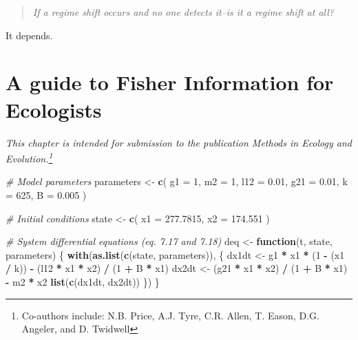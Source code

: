 \documentclass[12pt,twoside,openany]{reedthesis}
\newenvironment{Shaded}{\begin{snugshade}}{\end{snugshade}}
\newcommand{\KeywordTok}[1]{\textcolor[rgb]{0.13,0.29,0.53}{\textbf{#1}}}
\newcommand{\DataTypeTok}[1]{\textcolor[rgb]{0.13,0.29,0.53}{#1}}
\newcommand{\DecValTok}[1]{\textcolor[rgb]{0.00,0.00,0.81}{#1}}
\newcommand{\FloatTok}[1]{\textcolor[rgb]{0.00,0.00,0.81}{#1}}
\newcommand{\StringTok}[1]{\textcolor[rgb]{0.31,0.60,0.02}{#1}}
\newcommand{\CommentTok}[1]{\textcolor[rgb]{0.56,0.35,0.01}{\textit{#1}}}
\newcommand{\ControlFlowTok}[1]{\textcolor[rgb]{0.13,0.29,0.53}{\textbf{#1}}}
\newcommand{\OperatorTok}[1]{\textcolor[rgb]{0.81,0.36,0.00}{\textbf{#1}}}
\newcommand{\NormalTok}[1]{#1}
\begin{document}
\begin{quote}
\emph{If a regime shift occurs and no one detects it--is it a regime
shift at all?}
\end{quote}
It depends.

\chapter{A guide to Fisher Information for
Ecologists}\label{fiGuide-chapter}

\emph{This chapter is intended for submission to the publication
\emph{Methods in Ecology and Evolution}.\footnote{Co-authors include:
  N.B. Price, A.J. Tyre, C.R. Allen, T. Eason, D.G. Angeler, and D.
  Twidwell}}
\begin{Shaded}
\begin{Highlighting}[]
\CommentTok{# Model parameters}
\NormalTok{parameters <-}\StringTok{ }\KeywordTok{c}\NormalTok{(}
  \DataTypeTok{g1 =} \DecValTok{1}\NormalTok{,}
  \DataTypeTok{m2 =} \DecValTok{1}\NormalTok{,}
  \DataTypeTok{l12 =} \FloatTok{0.01}\NormalTok{,}
  \DataTypeTok{g21 =} \FloatTok{0.01}\NormalTok{,}
  \DataTypeTok{k =} \DecValTok{625}\NormalTok{,}
  \DataTypeTok{B =} \FloatTok{0.005}
\NormalTok{)}

\CommentTok{# Initial conditions}
\NormalTok{state <-}\StringTok{ }\KeywordTok{c}\NormalTok{(}
  \DataTypeTok{x1 =} \FloatTok{277.7815}\NormalTok{, }
  \DataTypeTok{x2 =} \FloatTok{174.551}
\NormalTok{)}

\CommentTok{# System differential equations (eq. 7.17 and 7.18)}
\NormalTok{deq <-}\StringTok{ }\ControlFlowTok{function}\NormalTok{(t, state, parameters) \{}
  \KeywordTok{with}\NormalTok{(}\KeywordTok{as.list}\NormalTok{(}\KeywordTok{c}\NormalTok{(state, parameters)), \{}
\NormalTok{    dx1dt <-}\StringTok{ }\NormalTok{g1 }\OperatorTok{*}\StringTok{ }\NormalTok{x1 }\OperatorTok{*}\StringTok{ }\NormalTok{(}\DecValTok{1} \OperatorTok{-}\StringTok{ }\NormalTok{(x1 }\OperatorTok{/}\StringTok{ }\NormalTok{k)) }\OperatorTok{-}\StringTok{ }\NormalTok{(l12 }\OperatorTok{*}\StringTok{ }\NormalTok{x1 }\OperatorTok{*}\StringTok{ }\NormalTok{x2) }\OperatorTok{/}\StringTok{ }\NormalTok{(}\DecValTok{1} \OperatorTok{+}\StringTok{ }\NormalTok{B }\OperatorTok{*}\StringTok{ }\NormalTok{x1)}
\NormalTok{    dx2dt <-}\StringTok{ }\NormalTok{(g21 }\OperatorTok{*}\StringTok{ }\NormalTok{x1 }\OperatorTok{*}\StringTok{ }\NormalTok{x2) }\OperatorTok{/}\StringTok{ }\NormalTok{(}\DecValTok{1} \OperatorTok{+}\StringTok{ }\NormalTok{B }\OperatorTok{*}\StringTok{ }\NormalTok{x1) }\OperatorTok{-}\StringTok{ }\NormalTok{m2 }\OperatorTok{*}\StringTok{ }\NormalTok{x2}
    \KeywordTok{list}\NormalTok{(}\KeywordTok{c}\NormalTok{(dx1dt, dx2dt))}
\NormalTok{  \})}
\NormalTok{\}}
\end{Highlighting}
\end{Shaded}
\end{document}
